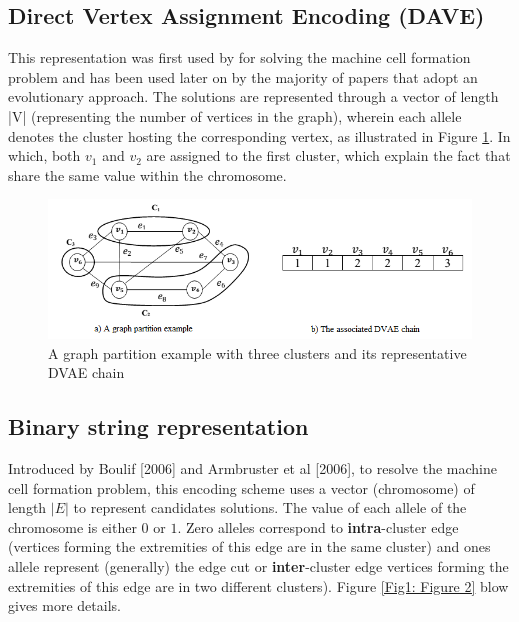 \documentclass[review]{elsarticle}
\begin{document}
\subsection{Direct Vertex Assignment Encoding (DAVE)}

This representation was first used by \cite{venugopal_narendran_1992} for solving the machine cell formation problem and has been used later on by the majority of papers that adopt an evolutionary approach. The solutions are represented through a vector of length |V| (representing the number of vertices in the graph), wherein each allele denotes the cluster hosting the corresponding vertex, as illustrated in Figure \ref{Fig1: Figure 1}. In which, both $v_1$ and $v_2$ are assigned to the first cluster, which explain the fact that share the same value within the chromosome. 

\begin{center}
\begin{figure}[H]
	\centering
	\includegraphics[scale=0.6]{figurePaper/figure1.png} 
	\caption{\label{Fig1: Figure 1} A graph partition example with three clusters and its representative DVAE chain}
\end{figure}
\end{center}

\subsection{Binary string representation }
Introduced by Boulif [2006] and Armbruster et al [2006], to resolve the machine cell formation problem, this encoding scheme uses a vector (chromosome) of length $|E|$ to represent candidates solutions. The value of each allele of the chromosome is either $0$ or $1$. Zero alleles correspond to \textbf{intra}-cluster edge (vertices forming the extremities of this edge are in the same cluster) and ones allele represent (generally) the edge cut or \textbf{inter}-cluster edge vertices forming the extremities of this edge are in two different clusters). Figure \ref{Fig1: Figure 2} blow gives more details.
\end{document}
